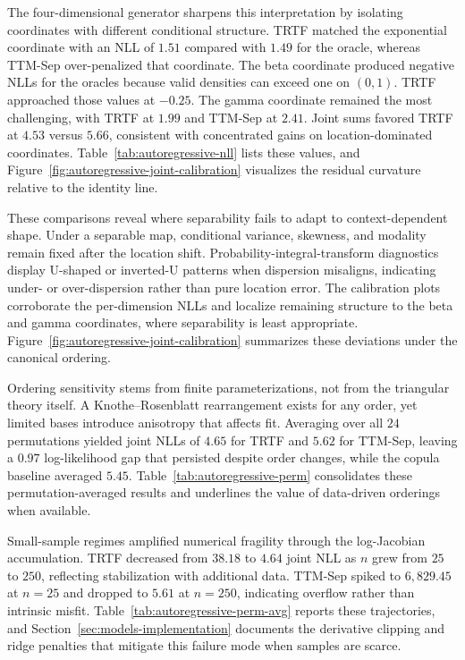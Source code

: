 \documentclass[11pt,a4paper,twoside]{book}\usepackage[]{graphicx}\usepackage[]{xcolor}
\begin{document}
The four-dimensional generator sharpens this interpretation by isolating coordinates with different conditional structure. TRTF matched the exponential coordinate with an NLL of $1.51$ compared with $1.49$ for the oracle, whereas TTM-Sep over-penalized that coordinate. The beta coordinate produced negative NLLs for the oracles because valid densities can exceed one on $(0,1)$. TRTF approached those values at $-0.25$. The gamma coordinate remained the most challenging, with TRTF at $1.99$ and TTM-Sep at $2.41$. Joint sums favored TRTF at $4.53$ versus $5.66$, consistent with concentrated gains on location-dominated coordinates. Table~\ref{tab:autoregressive-nll} lists these values, and Figure~\ref{fig:autoregressive-joint-calibration} visualizes the residual curvature relative to the identity line.

These comparisons reveal where separability fails to adapt to context-dependent shape. Under a separable map, conditional variance, skewness, and modality remain fixed after the location shift. Probability-integral-transform diagnostics display U-shaped or inverted-U patterns when dispersion misaligns, indicating under- or over-dispersion rather than pure location error. The calibration plots corroborate the per-dimension NLLs and localize remaining structure to the beta and gamma coordinates, where separability is least appropriate. Figure~\ref{fig:autoregressive-joint-calibration} summarizes these deviations under the canonical ordering.

Ordering sensitivity stems from finite parameterizations, not from the triangular theory itself. A Knothe--Rosenblatt rearrangement exists for any order, yet limited bases introduce anisotropy that affects fit. Averaging over all $24$ permutations yielded joint NLLs of $4.65$ for TRTF and $5.62$ for TTM-Sep, leaving a $0.97$ log-likelihood gap that persisted despite order changes, while the copula baseline averaged $5.45$. Table~\ref{tab:autoregressive-perm} consolidates these permutation-averaged results and underlines the value of data-driven orderings when available.

Small-sample regimes amplified numerical fragility through the log-Jacobian accumulation. TRTF decreased from $38.18$ to $4.64$ joint NLL as $n$ grew from $25$ to $250$, reflecting stabilization with additional data. TTM-Sep spiked to $6{,}829.45$ at $n=25$ and dropped to $5.61$ at $n=250$, indicating overflow rather than intrinsic misfit. Table~\ref{tab:autoregressive-perm-avg} reports these trajectories, and Section~\ref{sec:models-implementation} documents the derivative clipping and ridge penalties that mitigate this failure mode when samples are scarce.
\end{document}
